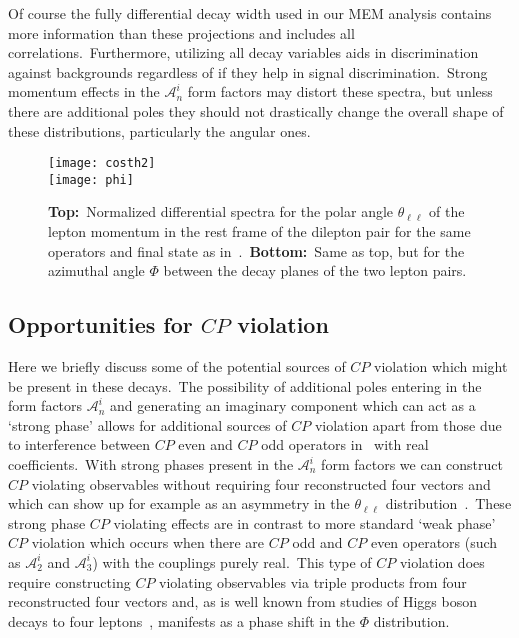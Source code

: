 \documentclass[nofootinbib,twocolumn,prl,preprintnumbers]{revtex4-1}
\begin{document}
Of course the fully differential decay width used in our MEM analysis contains more information than these projections and includes all correlations.~Furthermore, utilizing all decay variables aids in discrimination against  backgrounds regardless of if they help in signal discrimination.~Strong momentum effects in the $\mathcal{A}_{n}^{i}$ form factors may distort these spectra, but unless there are additional poles they should not drastically change the overall shape of these distributions, particularly the angular ones.
\begin{figure}[tbh]
\begin{center}
\texttt{[image: costh2]}\\
\texttt{[image: phi]}
\caption{{\bf Top:}~Normalized differential spectra for the polar angle $\theta_{\ell\ell}$ of the lepton momentum in the rest frame of the dilepton pair for the same operators and final state as in~.~{\bf Bottom:}~Same as top, but for the azimuthal angle $\Phi$ between the decay planes of the two lepton pairs.
}
\label{fig:angles}
\end{center}
\end{figure}

\subsection{Opportunities for $CP$ violation} \label{sec:cpv}

Here we briefly discuss some of the potential sources of $CP$ violation which might be present in these decays.~The possibility of additional poles entering in the form factors $\mathcal{A}_n^{i}$ and generating an imaginary component which can act as a `strong phase' allows for additional sources of $CP$ violation apart from those due to interference between $CP$ even and $CP$ odd operators in~ with real coefficients.~With strong phases present in the $\mathcal{A}_n^{i}$ form factors we can construct $CP$ violating observables without requiring four reconstructed four vectors and which can show up for example as an asymmetry in the $\theta_{\ell\ell}$ distribution~\cite{Chen:2014ona,Li:2015kxc,Chen:2017plj}.~These strong phase $CP$ violating effects are in contrast to more standard `weak phase' $CP$ violation which occurs when there are $CP$ odd and $CP$ even operators (such as $\mathcal{A}_2^{i}$ and $\mathcal{A}_3^{i}$) with the couplings purely real.~This type of $CP$ violation does require constructing $CP$ violating observables via triple products from four reconstructed four vectors and, as is well known from studies of Higgs boson decays to four leptons~\cite{Cao:2009ah}, manifests as a phase shift in the $\Phi$ distribution.
\end{document}
